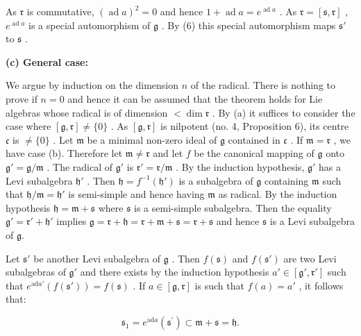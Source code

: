 As \(\mathfrak{r}\) is commutative, \((\operatorname{ad} a)^2 = 0\) and hence \(1 + \operatorname{ad} a = e^{\operatorname{ad} a}\) . As \(\mathfrak{r} = [\mathfrak{s}, \mathfrak{r}]\) , \(e^{\operatorname{ad} a}\) is a special automorphism of \(\mathfrak{g}\) . By (6) this special automorphism maps \(\mathfrak{s}'\) to \(\mathfrak{s}\) .

\textbf{(c) General case:}

We argue by induction on the dimension \(n\) of the radical. There is nothing to prove if \(n = 0\) and hence it can be assumed that the theorem holds for Lie algebras whose radical is of dimension \(<\dim \mathfrak{r}\) . By (a) it suffices to consider the case where \([\mathfrak{g}, \mathfrak{r}] \neq \{0\}\) . As \([\mathfrak{g}, \mathfrak{r}]\) is nilpotent (no. 4, Proposition 6), its centre \(\mathfrak{c}\) is \(\neq \{0\}\) . Let \(\mathfrak{m}\) be a minimal non-zero ideal of \(\mathfrak{g}\) contained in \(\mathfrak{c}\) . If \(\mathfrak{m} = \mathfrak{r}\) , we have case (b). Therefore let \(\mathfrak{m} \neq \mathfrak{r}\) and let \(f\) be the canonical mapping of \(\mathfrak{g}\) onto \(\mathfrak{g}' = \mathfrak{g}/\mathfrak{m}\) . The radical of \(\mathfrak{g}'\) is \(\mathfrak{r}' = \mathfrak{r}/\mathfrak{m}\) . By the induction hypothesis, \(\mathfrak{g}'\) has a Levi subalgebra \(\mathfrak{h}'\) . Then \(\mathfrak{h} = f^{-1}(\mathfrak{h}')\) is a subalgebra of \(\mathfrak{g}\) containing \(\mathfrak{m}\) such that \(\mathfrak{h}/\mathfrak{m} = \mathfrak{h}'\) is semi-simple and hence having \(\mathfrak{m}\) as radical. By the induction hypothesis \(\mathfrak{h} = \mathfrak{m} + \mathfrak{s}\) where \(\mathfrak{s}\) is a semi-simple subalgebra. Then the equality \(\mathfrak{g}' = \mathfrak{r}' + \mathfrak{h}'\) implies \(\mathfrak{g} = \mathfrak{r} + \mathfrak{h} = \mathfrak{r} + \mathfrak{m} + \mathfrak{s} = \mathfrak{r} + \mathfrak{s}\) and hence \(\mathfrak{s}\) is a Levi subalgebra of \(\mathfrak{g}\).

Let \(\mathfrak{s}'\) be another Levi subalgebra of \(\mathfrak{g}\) . Then \(f(\mathfrak{s})\) and \(f(\mathfrak{s}')\) are two Levi subalgebras of \(\mathfrak{g}'\) and there exists by the induction hypothesis \(a' \in [\mathfrak{g}', \mathfrak{r}']\) such that \(e^{\mathrm{ad} a'}(f(\mathfrak{s}')) = f(\mathfrak{s})\) . If \(a \in [\mathfrak{g}, \mathfrak{r}]\) is such that \(f(a) = a'\) , it follows that:

\[
\mathfrak {s} _ {1} = e ^ {\mathrm{ad} a} \left(\mathfrak {s} ^ {\prime}\right) \subset \mathfrak {m} + \mathfrak {s} = \mathfrak {h}.
\]


